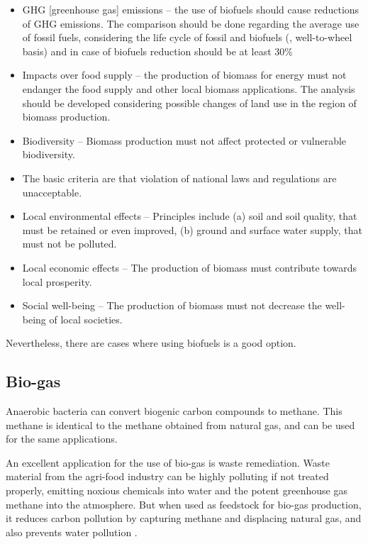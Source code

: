 \begin{itemize}
  \item GHG [greenhouse gas] emissions – the use of biofuels should cause reductions of GHG emissions. The
comparison should be done regarding the average use of fossil fuels, considering the life
cycle of fossil and biofuels (, well-to-wheel basis) and in case of biofuels reduction
should be at least 30\%
 \item Impacts over food supply – the production of biomass for energy must not endanger the
food supply and other local biomass applications. The analysis should be developed
considering possible changes of land use in the region of biomass production.
 \item Biodiversity – Biomass production must not affect protected or vulnerable biodiversity.
 \item The basic criteria are that violation of national laws and regulations are unacceptable.
 \item Local environmental effects – Principles include (a) soil and soil quality, that must be
retained or even improved, (b) ground and surface water supply, that must not be polluted.
 \item Local economic effects – The production of biomass must contribute towards local
prosperity.
 \item  Social well-being – The production of biomass must not decrease the well-being of local societies. 
\end{itemize}

Nevertheless, there are cases where using biofuels is a good option. 

\subsection{Bio-gas}

Anaerobic bacteria can convert biogenic carbon compounds to methane. This
methane is identical to the methane obtained from natural gas, and can be used
for the same applications.

An excellent application for the use of bio-gas is waste remediation. Waste
material from the agri-food industry can be highly polluting if not treated
properly, emitting noxious chemicals into water and the potent greenhouse gas
methane into the atmosphere. But when used as feedstock for bio-gas production,
it reduces carbon pollution by capturing methane and displacing natural gas, and
also prevents water pollution \autocite{Venter2014}. 

